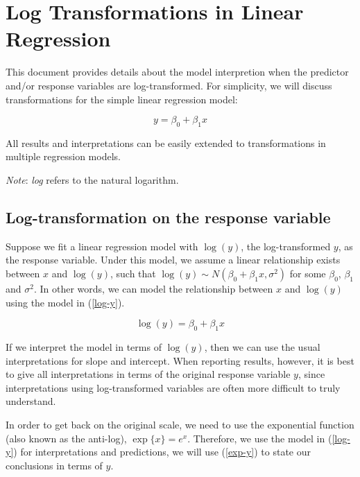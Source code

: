 \documentclass[]{book}
\begin{document}
\chapter{Log Transformations in Linear
Regression}\label{log-transformations-in-linear-regression}

This document provides details about the model interpretion when the
predictor and/or response variables are log-transformed. For simplicity,
we will discuss transformations for the simple linear regression model:

\begin{equation}
\label{orig}
y = \beta_0 + \beta_1 x
\end{equation}

All results and interpretations can be easily extended to
transformations in multiple regression models.

\emph{Note}: \emph{log} refers to the natural logarithm.

\section{Log-transformation on the response
variable}\label{log-transformation-on-the-response-variable}

Suppose we fit a linear regression model with \(\log(y)\), the
log-transformed \(y\), as the response variable. Under this model, we
assume a linear relationship exists between \(x\) and \(\log(y)\), such
that \(\log(y) \sim N(\beta_0 + \beta_1 x, \sigma^2)\) for some
\(\beta_0\), \(\beta_1\) and \(\sigma^2\). In other words, we can model
the relationship between \(x\) and \(\log(y)\) using the model in
(\ref{log-y}).

\begin{equation}
\label{log-y}
\log(y) = \beta_0 + \beta_1 x
\end{equation}

If we interpret the model in terms of \(\log(y)\), then we can use the
usual interpretations for slope and intercept. When reporting results,
however, it is best to give all interpretations in terms of the original
response variable \(y\), since interpretations using log-transformed
variables are often more difficult to truly understand.

In order to get back on the original scale, we need to use the
exponential function (also known as the anti-log), \(\exp\{x\} = e^x\).
Therefore, we use the model in (\ref{log-y}) for interpretations and
predictions, we will use (\ref{exp-y}) to state our conclusions in terms
of \(y\).
\end{document}
